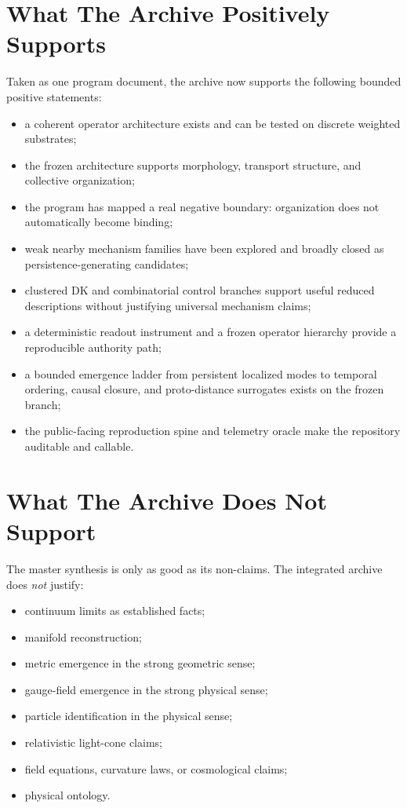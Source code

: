 \documentclass[11pt]{article}
\begin{document}
\section{What The Archive Positively Supports}

Taken as one program document, the archive now supports the following bounded positive statements:
\begin{itemize}
\item a coherent operator architecture exists and can be tested on discrete weighted substrates;
\item the frozen architecture supports morphology, transport structure, and collective organization;
\item the program has mapped a real negative boundary: organization does not automatically become binding;
\item weak nearby mechanism families have been explored and broadly closed as persistence-generating candidates;
\item clustered DK and combinatorial control branches support useful reduced descriptions without justifying universal mechanism claims;
\item a deterministic readout instrument and a frozen operator hierarchy provide a reproducible authority path;
\item a bounded emergence ladder from persistent localized modes to temporal ordering, causal closure, and proto-distance surrogates exists on the frozen branch;
\item the public-facing reproduction spine and telemetry oracle make the repository auditable and callable.
\end{itemize}

\section{What The Archive Does Not Support}

The master synthesis is only as good as its non-claims. The integrated archive does \emph{not} justify:
\begin{itemize}
\item continuum limits as established facts;
\item manifold reconstruction;
\item metric emergence in the strong geometric sense;
\item gauge-field emergence in the strong physical sense;
\item particle identification in the physical sense;
\item relativistic light-cone claims;
\item field equations, curvature laws, or cosmological claims;
\item physical ontology.
\end{itemize}
\end{document}
